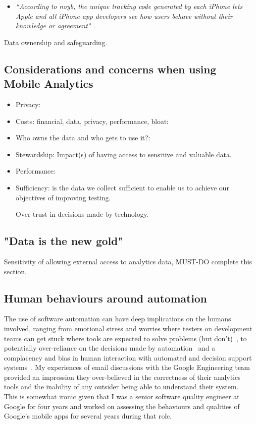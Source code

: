 \begin{itemize}
    \item \emph{``According to noyb, the unique tracking code generated by each iPhone lets Apple and all iPhone app developers see how users behave without their knowledge or agreement"}~\citep{ft2020_apple_tracks_iphone_users_without_consent}.
\end{itemize}

Data ownership and safeguarding.

\subsection{Considerations and concerns when using Mobile Analytics}
\begin{itemize}
    \item Privacy:
    \item Costs: financial, data, privacy, performance, bloat:
    \item Who owns the data and who gets to use it?:
    \item Stewardship: Impact(s) of having access to sensitive and valuable data.
    \item Performance:
    \item Sufficiency: is the data we collect sufficient to enable us to achieve our objectives of improving testing.
    \item [Over] trust in decisions made by technology.
\end{itemize}


\subsection{"Data is the new gold"}

Sensitivity of allowing external access to analytics data, MUST-DO complete this section. 

\subsection{Human behaviours around automation}
The use of software automation can have deep implications on the humans involved, ranging from emotional stress and worries where testers on development teams can get stuck where tools are expected to solve problems (but don't)~\cite{evans2020stuck}, to potentially over-reliance on the decisions made by automation~\cite{cummings2004automation} and a complacency and bias in human interaction with automated and decision support systems~\cite{parasuraman_complacency_and_bias_in_human_use_of_automation}. 
My experiences of email discussions with the Google Engineering team provided an impression they over-believed in the correctness of their analytics tools and the inability of any outsider 
being able to understand their system. This is somewhat ironic given that I was a senior software quality engineer at Google for four years and worked on assessing the behaviours and qualities of Google's mobile apps for several years during that role.

